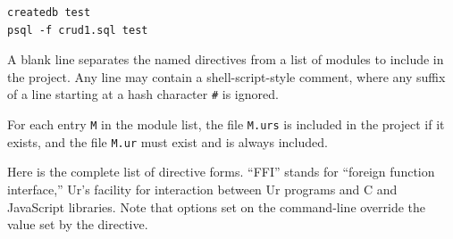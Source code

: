\documentclass{article}
\begin{document}
\begin{verbatim}
createdb test
psql -f crud1.sql test
\end{verbatim}

A blank line separates the named directives from a list of modules to include in the project.  Any line may contain a shell-script-style comment, where any suffix of a line starting at a hash character \texttt{\#} is ignored.

For each entry \texttt{M} in the module list, the file \texttt{M.urs} is included in the project if it exists, and the file \texttt{M.ur} must exist and is always included.

Here is the complete list of directive forms.  ``FFI'' stands for ``foreign function interface,'' Ur's facility for interaction between Ur programs and C and JavaScript libraries.  Note that options set on the command-line override the value set by the directive.
\end{document}
